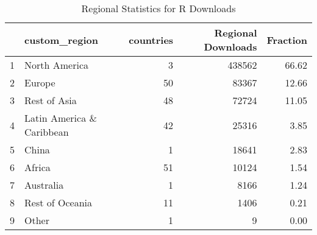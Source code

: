 \begin{table}[ht]
\centering
\begin{tabular}{rlrrr}
  \hline
 & custom\_region & countries & Regional Downloads & Fraction \\ 
  \hline
1 & North America &   3 & 438562 & 66.62 \\ 
  2 & Europe &  50 & 83367 & 12.66 \\ 
  3 & Rest of Asia &  48 & 72724 & 11.05 \\ 
  4 & Latin America \& Caribbean &  42 & 25316 & 3.85 \\ 
  5 & China &   1 & 18641 & 2.83 \\ 
  6 & Africa &  51 & 10124 & 1.54 \\ 
  7 & Australia &   1 & 8166 & 1.24 \\ 
  8 & Rest of Oceania &  11 & 1406 & 0.21 \\ 
  9 & Other &   1 &   9 & 0.00 \\ 
   \hline
\end{tabular}
\caption{Regional Statistics for R Downloads} 
\label{tab:r_downloads_regional_stats_select}
\end{table}
